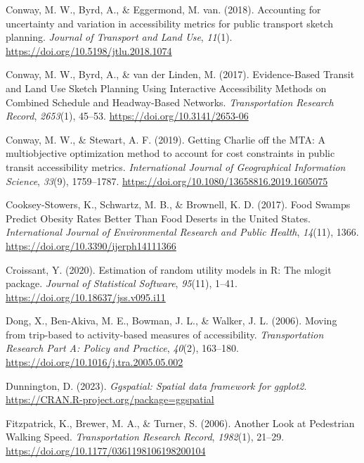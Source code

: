 \documentclass[
  letterpaper,
  number,
  review,
  3p]{elsarticle}
\newlength{\cslhangindent}
\newenvironment{CSLReferences}[2] %
 {\begin{list}{}{%
  \setlength{\itemindent}{0pt}
  \setlength{\leftmargin}{0pt}
  \setlength{\parsep}{0pt}
  \ifodd #1
   \setlength{\leftmargin}{\cslhangindent}
   \setlength{\itemindent}{-1\cslhangindent}
  \fi
  \setlength{\itemsep}{#2\baselineskip}}}
 {\end{list}}
\begin{document}
\begin{CSLReferences}{1}{0}
Conway, M. W., Byrd, A., \& Eggermond, M. van. (2018). Accounting for
uncertainty and variation in accessibility metrics for public transport
sketch planning. \emph{Journal of Transport and Land Use}, \emph{11}(1).
\url{https://doi.org/10.5198/jtlu.2018.1074}

Conway, M. W., Byrd, A., \& van der Linden, M. (2017). Evidence-{Based
Transit} and {Land Use Sketch Planning Using Interactive Accessibility
Methods} on {Combined Schedule} and {Headway-Based Networks}.
\emph{Transportation Research Record}, \emph{2653}(1), 45--53.
\url{https://doi.org/10.3141/2653-06}

Conway, M. W., \& Stewart, A. F. (2019). Getting {Charlie} off the
{MTA}: A multiobjective optimization method to account for cost
constraints in public transit accessibility metrics. \emph{International
Journal of Geographical Information Science}, \emph{33}(9), 1759--1787.
\url{https://doi.org/10.1080/13658816.2019.1605075}

Cooksey-Stowers, K., Schwartz, M. B., \& Brownell, K. D. (2017). Food
{Swamps Predict Obesity Rates Better Than Food Deserts} in the {United
States}. \emph{International Journal of Environmental Research and
Public Health}, \emph{14}(11), 1366.
\url{https://doi.org/10.3390/ijerph14111366}

Croissant, Y. (2020). Estimation of random utility models in {R}: The
{mlogit} package. \emph{Journal of Statistical Software}, \emph{95}(11),
1--41. \url{https://doi.org/10.18637/jss.v095.i11}

Dong, X., Ben-Akiva, M. E., Bowman, J. L., \& Walker, J. L. (2006).
Moving from trip-based to activity-based measures of accessibility.
\emph{Transportation Research Part A: Policy and Practice},
\emph{40}(2), 163--180. \url{https://doi.org/10.1016/j.tra.2005.05.002}

Dunnington, D. (2023). \emph{Ggspatial: Spatial data framework for
ggplot2}. \url{https://CRAN.R-project.org/package=ggspatial}

Fitzpatrick, K., Brewer, M. A., \& Turner, S. (2006). Another {Look} at
{Pedestrian Walking Speed}. \emph{Transportation Research Record},
\emph{1982}(1), 21--29.
\url{https://doi.org/10.1177/0361198106198200104}


\end{CSLReferences}
\end{document}
